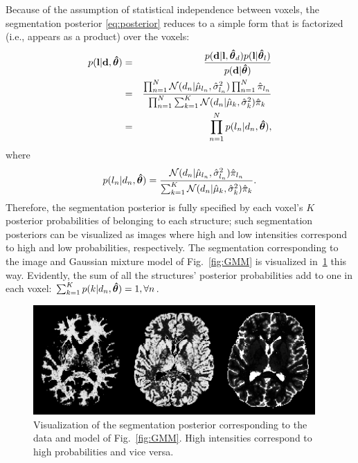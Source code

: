 \documentclass[10pt,twoside]{book}
\begin{document}
Because of the assumption of statistical independence between voxels, the segmentation posterior \eqref{eq:posterior} reduces to a simple form that is factorized (i.e., appears as a product) over the voxels:
\begin{eqnarray}
  p( \fat{l} | \fat{d}, \bldgr{\hat{\theta}}) & = & \frac{p( \fat{d} | \fat{l}, \bldgr{\hat{\theta}}_d ) p( \fat{l} | \bldgr{\hat{\theta}}_l )}%
                                                         {p( \fat{d} | \bldgr{\hat{\theta}} )} \nonumber\\
                                              & = & \frac{\prod_{n=1}^N \N( d_n | \hat{\mu}_{l_n}, \hat{\sigma}_{l_n}^2 ) \prod_{n=1}^N \hat{\pi}_{l_n}}%
                                                         {\prod_{n=1}^N \sum_{k=1}^K \N( d_n | \hat{\mu}_k, \hat{\sigma}_k^2 ) \hat{\pi}_k } \nonumber\\
                                              & = & \prod_{n=1}^N p( l_n | d_n, \bldgr{\hat{\theta}} ),
  \label{eq:GMMjointPosterior}
\end{eqnarray}
where 
\begin{equation}
  p( l_n | d_n, \bldgr{\hat{\theta}} ) = \frac{ \N( d_n | \hat{\mu}_{l_n}, \hat{\sigma}_{l_n}^2 ) \hat{\pi}_{l_n} }%
                                              { \sum_{k=1}^K \N( d_n | \hat{\mu}_k, \hat{\sigma}_k^2 ) \hat{\pi}_k }.
  \label{eq:GMMposterior}
\end{equation}
Therefore, the segmentation posterior is fully specified by each voxel's $K$ posterior probabilities of belonging to each structure; such segmentation posteriors can be visualized as images where high and low intensities correspond to high and low probabilities, respectively. The segmentation corresponding to the image and Gaussian mixture model of Fig.~\ref{fig:GMM} is visualized in~\ref{fig:GMMSegmentation} this way. 
Evidently, the sum of all the structures' posterior probabilities add to one in each voxel: $\sum_{k=1}^K p( k | d_n, {\mbox{\boldmath {${\hat{\theta}}$}}} ) = 1, \forall n$. 

\begin{figure}
  \centering
  \includegraphics[width=0.96\textwidth]{brainTissueClassification}
  \caption{Visualization of the segmentation posterior corresponding to the data and model of Fig.~\ref{fig:GMM}. High intensities correspond to high probabilities and vice versa.}
  \label{fig:GMMSegmentation}
\end{figure}
\end{document}
